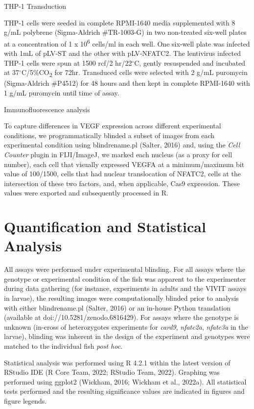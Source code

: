 THP-1 Transduction

THP-1 cells were seeded in complete RPMI-1640 media supplemented with 8 \textmu g/mL polybrene (Sigma-Aldrich \#TR-1003-G) in two non-treated six-well plates at a concentration of 1 x 10\textsuperscript{6} cells/ml in each well. One six-well plate was infected with 1mL of pLV-ST and the other with pLV-NFATC2. The lentivirus infected THP-1 cells were spun at 1500 rcf/2 hr/22$^{\circ}$C, gently resuspended and incubated at 37$^{\circ}$C/5\%CO\textsubscript{2} for 72hr. Transduced cells were selected with 2 \textmu g/mL puromycin (Sigma-Aldrich \#P4512) for 48 hours and then kept in complete RPMI-1640 with 1 \textmu g/mL puromycin until time of assay.

Immunofluorescence analysis

To capture differences in VEGF expression across different experimental conditions, we programmatically blinded a subset of images from each experimental condition using blindrename.pl (Salter, 2016) and, using the \textit{Cell Counter} plugin in FIJI/ImageJ, we marked each nucleus (as a proxy for cell number), each cell that visually expressed VEGFA at a minimum/maximum bit value of 100/1500, cells that had nuclear translocation of NFATC2, cells at the intersection of these two factors, and, when applicable, Cas9 expression. These values were exported and subsequently processed in R.

\section{Quantification and Statistical Analysis}

All assays were performed under experimental blinding. For all assays where the genotype or experimental condition of the fish was apparent to the experimenter during data gathering (for instance, experiments in adults and the VIVIT assays in larvae), the resulting images were computationally blinded prior to analysis with either blindrename.pl (Salter, 2016) or an in-house Python translation (available at doi://10.5281/zenodo.6816429). For assays where the genotype is unknown (in-cross of heterozygotes experiments for \textit{card9}, \textit{nfatc2a}, \textit{nfatc3a} in the larvae), blinding was inherent in the design of the experiment and genotypes were matched to the individual fish \textit{post hoc}. 

Statistical analysis was performed using R 4.2.1 within the latest version of RStudio IDE (R Core Team, 2022; RStudio Team, 2022). Graphing was performed using ggplot2 (Wickham, 2016; Wickham et al., 2022a). All statistical tests performed and the resulting significance values are indicated in figures and figure legends.

